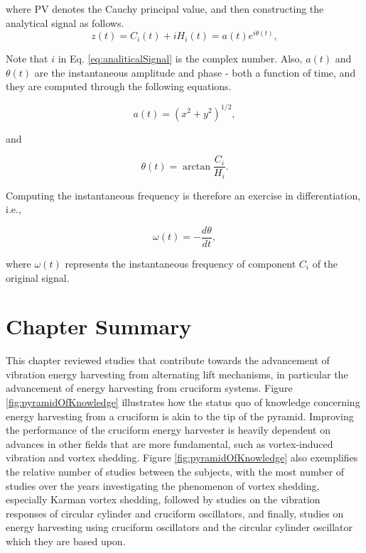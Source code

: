 \documentclass[oneside]{utmthesis}
\begin{document}
\noindent where PV denotes the Cauchy principal value, and then constructing the analytical signal as follows.
\begin{equation}
  z \left( t \right) = C_{i} \left( t \right) + i H_{i} \left( t \right) = a(t)e^{i\theta(t)},
  \label{eq:analiticalSignal}
\end{equation}

\noindent Note that $i$ in Eq. \ref{eq:analiticalSignal} is the complex number.
Also, $a(t)$ and $\theta(t)$ are the instantaneous amplitude and phase - both a function of time, and they are computed through the following equations.

\begin{equation}
  a(t) = \left( x^{2} + y^{2} \right)^{1/2},
  \label{eq:instAmplitude}
\end{equation}

\noindent and

\begin{equation}
  \theta(t) = \arctan{\frac{C_{i}}{H_{i}}}.
  \label{eq:instPhase}
\end{equation}

\noindent Computing the instantaneous frequency is therefore an exercise in differentiation, i.e.,

\begin{equation}
  \omega(t) = - \frac{d\theta}{dt},
  \label{eq:instFrequency}
\end{equation}

\noindent where $\omega(t)$ represents the instantaneous frequency of component $C_{i}$ of the original signal.


\section{Chapter Summary}
This chapter reviewed studies that contribute towards the advancement of vibration energy harvesting from alternating lift mechanisms, in particular the advancement of energy harvesting from cruciform systems. Figure \ref{fig:pyramidOfKnowledge} illustrates how the status quo of knowledge concerning energy harvesting from a cruciform is akin to the tip of the pyramid. Improving the performance of the cruciform energy harvester is heavily dependent on advances in other fields that are more fundamental, such as vortex-induced vibration and vortex shedding. Figure \ref{fig:pyramidOfKnowledge} also exemplifies the relative number of studies between the subjects, with the most number of studies over the years investigating the phenomenon of vortex shedding, especially Karman vortex shedding, followed by studies on the vibration responses of circular cylinder and cruciform oscillators, and finally, studies on energy harvesting using cruciform oscillators and the circular cylinder oscillator which they are based upon.
\end{document}
